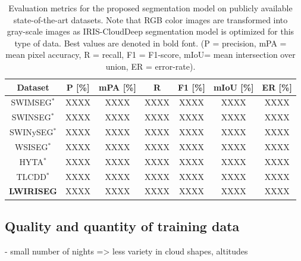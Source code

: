 \documentclass[amt, article]{copernicus}
\begin{document}
\begin{table}[t]
    \begin{center}
        \caption{Evaluation metrics for the proposed segmentation model on publicly available state-of-the-art datasets. Note that RGB color images are transformed into gray-scale images as IRIS-CloudDeep segmentation model is optimized for this type of data. Best values are denoted in bold font. (P = precision, mPA = mean pixel accuracy, R = recall, F1 = F1-score, mIoU= mean intersection over union, ER = error-rate).}
        \begin{tabular}{c c c c c c c} 
        \tophline \hline
         Dataset & P [\%] & mPA [\%] & R & F1 [\%] & mIoU [\%] & ER [\%] \\ [1.0ex]
         \hline
         SWIMSEG$^{*}$ & XXXX & XXXX & XXXX & XXXX & XXXX & XXXX \\ [1.0ex]
         SWINSEG$^{*}$ & XXXX & XXXX & XXXX & XXXX & XXXX & XXXX \\ [1.0ex]
         SWINySEG$^{*}$ & XXXX & XXXX & XXXX & XXXX & XXXX & XXXX \\ [1.0ex]
         WSISEG$^{*}$ & XXXX & XXXX & XXXX & XXXX & XXXX & XXXX \\ [1.0ex]
         HYTA$^{*}$ & XXXX & XXXX & XXXX & XXXX & XXXX & XXXX \\ [1.0ex]
         TLCDD$^{*}$ & XXXX & XXXX & XXXX & XXXX & XXXX & XXXX \\ [1.0ex]
         \textbf{LWIRISEG} & XXXX & XXXX & XXXX & XXXX & XXXX & XXXX \\
         \hline
        \end{tabular}
        \label{tab:datasets_comparison}
        \end{center}
    \end{table}


\subsection{Quality and quantity of training data}

- small number of nights => less variety in cloud shapes, altitudes
\end{document}
